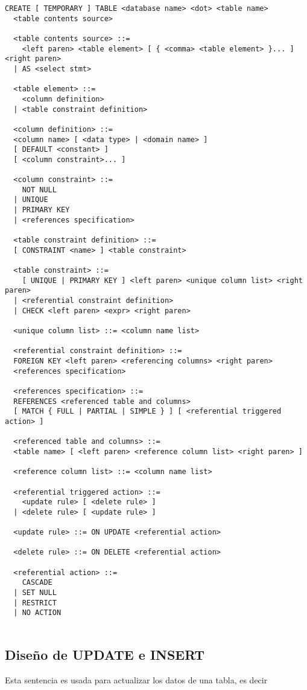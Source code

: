 \begin{Verbatim}[frame=single, label=sintaxis para CREATE TABLE]
  CREATE [ TEMPORARY ] TABLE <database name> <dot> <table name> 
  <table contents source>

  <table contents source> ::=
    <left paren> <table element> [ { <comma> <table element> }... ] <right paren>
  | AS <select stmt>
  
  <table element> ::=
    <column definition>
  | <table constraint definition>

  <column definition> ::=
  <column name> [ <data type> | <domain name> ]
  [ DEFAULT <constant> ]
  [ <column constraint>... ]
  
  <column constraint> ::=
    NOT NULL
  | UNIQUE
  | PRIMARY KEY
  | <references specification>

  <table constraint definition> ::=
  [ CONSTRAINT <name> ] <table constraint>

  <table constraint> ::=
    [ UNIQUE | PRIMARY KEY ] <left paren> <unique column list> <right paren>
  | <referential constraint definition>
  | CHECK <left paren> <expr> <right paren>

  <unique column list> ::= <column name list>

  <referential constraint definition> ::=
  FOREIGN KEY <left paren> <referencing columns> <right paren>
  <references specification>
  
  <references specification> ::=
  REFERENCES <referenced table and columns>
  [ MATCH { FULL | PARTIAL | SIMPLE } ] [ <referential triggered action> ]

  <referenced table and columns> ::=
  <table name> [ <left paren> <reference column list> <right paren> ]

  <reference column list> ::= <column name list>

  <referential triggered action> ::=
    <update rule> [ <delete rule> ]
  | <delete rule> [ <update rule> ]

  <update rule> ::= ON UPDATE <referential action>

  <delete rule> ::= ON DELETE <referential action>

  <referential action> ::=
    CASCADE
  | SET NULL
  | RESTRICT
  | NO ACTION


\end{Verbatim}

\subsection{Diseño de UPDATE e INSERT}
Esta sentencia es usada para actualizar los datos de una tabla, es decir

